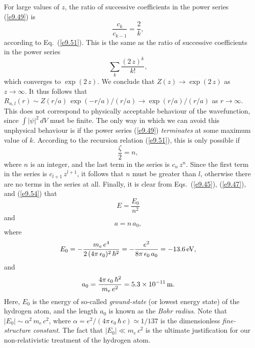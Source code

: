For large values of $z$, the ratio of successive coefficients in  the power series (\ref{e9.49})
is
\begin{equation}
\frac{c_k}{c_{k-1}} = \frac{2}{k},
\end{equation}
according to Eq.~(\ref{e9.51}). This is the same as the ratio
of successive coefficients in the power  series
\begin{equation}
\sum_k \frac{(2\,z)^k}{k!},
\end{equation}
which converges to $\exp(2\,z)$. We conclude that $Z(z)\rightarrow
\exp(2\,z)$ as $z\rightarrow\infty$. It thus follows that
$R_{n,l}(r)\sim Z(r/a)\,\exp(-r/a)/(r/a)\rightarrow \exp(r/a)/(r/a)$ as $r\rightarrow\infty$. This does not correspond to physically acceptable behaviour of the wavefunction, since $\int|\psi|^2\,dV$ must be finite.
The only way in which we can avoid this unphysical behaviour is if the
power series (\ref{e9.49}) {\em terminates}\/ at some maximum value of $k$. According to
the recursion relation (\ref{e9.51}), this is only possible if
\begin{equation}\label{e9.54}
\frac{\zeta}{2} = n,
\end{equation}
where $n$ is an integer, and the last term in the series is $c_n\,z^n$. Since the
first term in  the series is $c_{l+1}\,z^{l+1}$, it follows that $n$ must
be greater than $l$, otherwise there are no terms in the series at all. 
Finally, it is clear from Eqs.~(\ref{e9.45}),  (\ref{e9.47}), and (\ref{e9.54}) that
\begin{equation}\label{e9.55}
E = \frac{E_0}{n^2}
\end{equation}
and
\begin{equation}
a = n\,a_0,
\end{equation}
where
\begin{equation}\label{e9.56}
E_0 = -\frac{m_e\,e^4}{2\,(4\pi\,\epsilon_0)^2\,\hbar^2} = - \frac{e^2}{8\pi\,\epsilon_0\,a_0}
= -13.6\,{\rm eV},
\end{equation}
and
\begin{equation}\label{e9.57}
a_0 = \frac{4\pi\,\epsilon_0\,\hbar^2}{m_e\,e^2} = 5.3\times 10^{-11}\,{\rm m}.
\end{equation}
Here, $E_0$ is the energy of so-called {\em ground-state}\/ (or lowest energy state) of the
hydrogen atom, and the length $a_0$ is known as the {\em Bohr radius}. 
Note that $|E_0|\sim \alpha^2\,m_e\,c^2$, where $\alpha = e^2/ (4\pi\,\epsilon_0\,\hbar\,c)\simeq 1/137$ is the dimensionless {\em fine-structure constant}. The fact that $|E_0|\ll m_e\,c^2$ is the ultimate justification for our non-relativistic treatment of the hydrogen atom.

